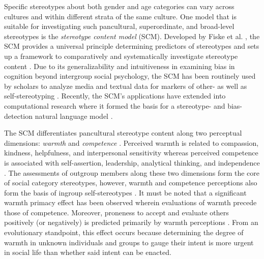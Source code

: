 \documentclass[jou]{apa7}
\begin{document}
Specific stereotypes about both gender and age categories can vary across cultures and within different strata of the same culture. One model that is suitable for investigating such pancultural, superordinate, and broad-level stereotypes is the \emph{stereotype content model} (SCM). Developed by Fiske et al. \parencite{fiskeModelOftenMixed2002}, the SCM provides a universal principle determining predictors of stereotypes and sets up a framework to comparatively and systematically investigate stereotype content \parencite{kroonReliableUnproductiveStereotypes2018,vanselmSearchOlderWorker2021}. Due to its generalizability and intuitiveness in examining bias in cognition beyond intergroup social psychology, the SCM has been routinely used by scholars to analyze media and textual data for markers of other- as well as self-stereotyping \parencite{westerhofFillingMissingLink2010,whiteThinkWomenThink2009}. Recently, the SCM’s applications have extended into computational research where it formed the basis for a stereotype- and bias-detection natural language model \parencite{nicolasComprehensiveStereotypeContent2020}.

The SCM differentiates pancultural stereotype content along two perceptual dimensions: \emph{warmth} and  \emph{competence} \parencite{cuddyStereotypeContentModel2009}. Perceived warmth is related to compassion, kindness, helpfulness, and interpersonal sensitivity whereas perceived competence is associated with self-assertion, leadership, analytical thinking, and independence \parencite[for a list of traits, see][]{Bruckmuller2012,Carli2016,hummertMultipleStereotypesElderly1990}. The assessments of outgroup members along these two dimensions form the core of social category stereotypes, however, warmth and competence perceptions also form the basis of ingroup self-stereotypes \parencite{hintonExploringRelationshipGay2019}. It must be noted that a significant warmth primacy effect has been observed wherein evaluations of warmth precede those of competence. Moreover, proneness to accept and evaluate others positively (or negatively) is predicted primarily by warmth perceptions \parencite{cuddyWarmthCompetenceUniversal2008,ponsiInfluenceWarmthCompetence2016}. From an evolutionary standpoint, this effect occurs because determining the degree of warmth in unknown individuals and groups to gauge their intent is more urgent in social life than whether said intent can be enacted.
\end{document}
